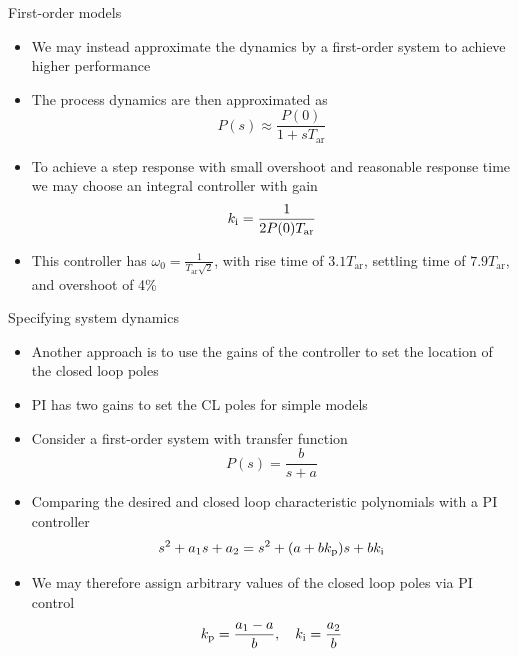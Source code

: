 \documentclass[10pt]{beamer-control}
\begin{document}
\begin{frame}{First-order models}
  \begin{itemize}
    \item We may instead approximate the dynamics by a first-order system to achieve higher performance
    \item The process dynamics are then approximated as
      \begin{equation}
        P(s) \approx \frac{P(0)}{1+sT_{\text{ar}}}
      \end{equation}
    \item To achieve a step response with small overshoot and reasonable response time we may choose an integral controller with gain
      \begin{equation}
        k_{\mathrm{i}} = \frac{1}{2P(0)T_{\text{ar}}}
      \end{equation}
    \item This controller has $\omega_0 = \tfrac{1}{T_{\text{ar}}\sqrt{2}}$, with rise time of $3.1 T_{\text{ar}}$, settling time of $7.9T_{\text{ar}}$, and overshoot of 4\%
  \end{itemize}
\end{frame}



\begin{frame}{Specifying system dynamics}
  \begin{itemize}
    \item Another approach is to use the gains of the controller to set the location of the closed loop poles
    \item PI has two gains to set the CL poles for simple models
    \item Consider a first-order system with transfer function
      \begin{equation}
        P(s) = \frac{b}{s+a}
      \end{equation}
    \item Comparing the desired and closed loop characteristic polynomials with a PI controller
      \begin{equation}
        s^2+a_1s+a_2 = s^2+(a+bk_{\mathrm{p}})s+bk_{\mathrm{i}}
      \end{equation}
    \item We may therefore assign arbitrary values of the closed loop poles via PI control
      \begin{equation}
        k_{\mathrm{p}}=\frac{a_1-a}{b}, \quad k_{\mathrm{i}} = \frac{a_2}{b}
      \end{equation}
  \end{itemize}
\end{frame}
\end{document}

